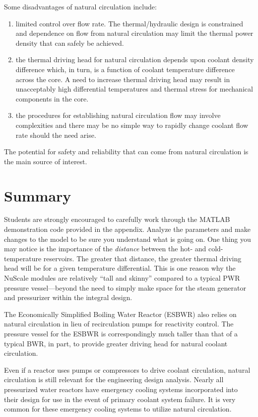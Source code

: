 Some disadvantages of natural circulation include:
\begin{enumerate}
\item limited control over flow rate.  The thermal/hydraulic design is constrained and dependence on flow from natural circulation may limit the thermal power density that can safely be achieved.
\item the thermal driving head for natural circulation depends upon coolant density difference which, in turn, is a function of coolant temperature difference across the core.  A need to increase thermal driving head may result in unacceptably high differential temperatures and thermal stress for mechanical components in the core.
\item the procedures for establishing natural circulation flow may involve complexities and there may be no simple way to rapidly change coolant flow rate should the need arise.
\end{enumerate}

The potential for safety and reliability that can come from natural circulation is the main source of interest.

\section{Summary}
Students are strongly encouraged to carefully work through the MATLAB demonstration code provided in the appendix.  Analyze the parameters and make changes to the model to be sure you understand what is going on.  One thing you may notice is the importance of the \emph{distance} between the hot- and cold-temperature reservoirs.  The greater that distance, the greater thermal driving head will be for a given temperature differential.  This is one reason why the NuScale modules are relatively ``tall and skinny'' compared to a typical PWR pressure vessel---beyond the need to simply make space for the steam generator and pressurizer within the integral design.  

The Economically Simplified Boiling Water Reactor (ESBWR) also relies on natural circulation in lieu of recirculation pumps for reactivity control.\cite{hinds2006next}  The pressure vessel for the ESBWR is correspondingly much taller than that of a typical BWR, in part, to provide greater driving head for natural coolant circulation. 

Even if a reactor uses pumps or compressors to drive coolant circulation, natural circulation is still relevant for the engineering design analysis.  Nearly all pressurized water reactors have emergency cooling systems incorporated into their design for use in the event of primary coolant system failure.  It is very common for these emergency cooling systems to utilize natural circulation.  

